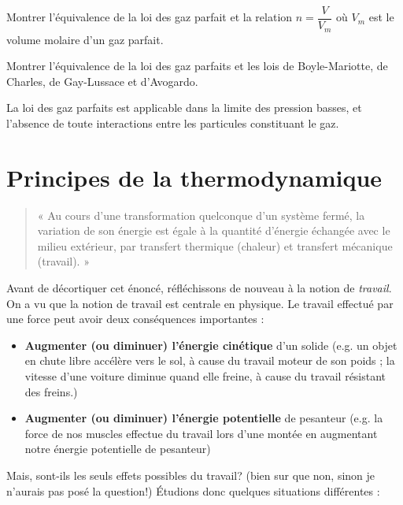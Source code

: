 \documentclass[11pt,a4paper]{article}
\begin{document}
\begin{exo}
Montrer l'équivalence de la loi des gaz parfait et la relation $n=\dfrac{V}{V_m}$ où $V_m$ est le volume molaire d'un gaz parfait. 
\vspace{2cm}
\end{exo}

\begin{exo}
Montrer l'équivalence de la loi des gaz parfaits et les lois de Boyle-Mariotte, de Charles, de Gay-Lussace et d'Avogardo. 
\vspace{4cm}
\end{exo}


\begin{rmrq}
La loi des gaz parfaits est applicable dans la limite des pression basses, et l'absence de toute interactions entre les particules constituant le gaz. 
\end{rmrq}


\section{Principes de la thermodynamique}

\begin{quote}
    « Au cours d'une transformation quelconque d'un système fermé, la variation de son énergie est égale à la quantité d'énergie échangée avec le milieu extérieur, par transfert thermique (chaleur) et transfert mécanique (travail). »
\end{quote}

Avant de décortiquer cet énoncé, réfléchissons de nouveau à la notion de \textit{travail}. On a vu que la notion de travail est centrale en physique.  Le travail effectué par une force peut avoir deux conséquences importantes :
\begin{itemize}
    \item \textbf{Augmenter (ou diminuer) l’énergie cinétique} d’un solide (e.g. un objet en chute libre accélère vers le sol, à cause du travail moteur de son poids ; la vitesse d’une voiture diminue quand elle freine, à cause du travail résistant des freins.) 
    \item \textbf{Augmenter (ou diminuer) l’énergie potentielle} de pesanteur (e.g. la force de nos muscles effectue du travail lors d’une montée en augmentant notre énergie potentielle de pesanteur)
\end{itemize}

Mais, sont-ils les seuls effets possibles  du travail? (bien sur que non, sinon je n'aurais pas posé la question!)  Étudions donc quelques situations différentes :
\end{document}

